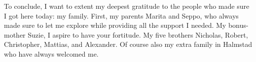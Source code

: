 To conclude, I want to extent my deepest gratitude to the people who made sure I got here today: my family. First, my parents Marita and Seppo, who always made sure to let me explore while providing all the support I needed. My bonus-mother Suzie, I aspire to have your fortitude. My five brothers Nicholas, Robert, Christopher, Mattias, and Alexander. Of course also my extra family in Halmstad who have always welcomed me. 

%
%
%
%
